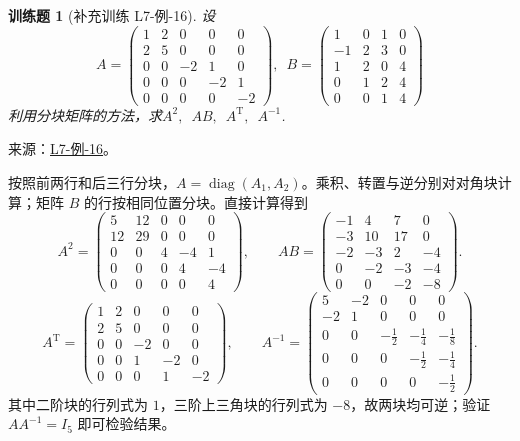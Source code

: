\documentclass[UTF8,12pt,a4paper,fontset=fandol]{ctexart}
\newtheorem{exercise}{训练题}[section]
\begin{document}
\begin{exercise}[补充训练 L7-例-16]\label{prob:L7-例-16}
设\[A=\begin{pmatrix}
            1 & 2 & 0  & 0  & 0  \\
            2 & 5 & 0  & 0  & 0  \\
            0 & 0 & -2 & 1  & 0  \\
            0 & 0 & 0  & -2 & 1  \\
            0 & 0 & 0  & 0  & -2
        \end{pmatrix},\enspace B=\begin{pmatrix}
            1  & 0 & 1 & 0 \\
            -1 & 2 & 3 & 0 \\
            1  & 2 & 0 & 4 \\
            0  & 1 & 2 & 4 \\
            0  & 0 & 1 & 4
        \end{pmatrix}\]
    利用分块矩阵的方法，求$A^2,\enspace AB,\enspace A^\mathrm{T},\enspace A^{-1}$.
\end{exercise}
\noindent 来源：\href{https://github.com/yhwu-is/Linear-Algebra-Left-Undone/blob/new/%E8%AE%B2%E4%B9%89/%E4%B8%93%E9%A2%98/7%20%E7%BA%BF%E6%80%A7%E6%98%A0%E5%B0%84%E7%9F%A9%E9%98%B5%E8%A1%A8%E7%A4%BA%E4%B8%8E%E7%9F%A9%E9%98%B5%E8%BF%90%E7%AE%97%E5%9F%BA%E7%A1%80.tex}{L7-例-16}。
\begin{solve}
按照前两行和后三行分块，$A=\operatorname{diag}(A_1,A_2)$。乘积、转置与逆分别对对角块计算；矩阵 $B$ 的行按相同位置分块。直接计算得到
\[A^2=\begin{pmatrix}5&12&0&0&0\\12&29&0&0&0\\0&0&4&-4&1\\0&0&0&4&-4\\0&0&0&0&4\end{pmatrix},\qquad AB=\begin{pmatrix}-1&4&7&0\\-3&10&17&0\\-2&-3&2&-4\\0&-2&-3&-4\\0&0&-2&-8\end{pmatrix}.\]
\[A^{\mathrm T}=\begin{pmatrix}1&2&0&0&0\\2&5&0&0&0\\0&0&-2&0&0\\0&0&1&-2&0\\0&0&0&1&-2\end{pmatrix},\qquad A^{-1}=\begin{pmatrix}5&-2&0&0&0\\-2&1&0&0&0\\0&0&-\frac{1}{2}&-\frac{1}{4}&-\frac{1}{8}\\0&0&0&-\frac{1}{2}&-\frac{1}{4}\\0&0&0&0&-\frac{1}{2}\end{pmatrix}.\]
其中二阶块的行列式为 $1$，三阶上三角块的行列式为 $-8$，故两块均可逆；验证 $AA^{-1}=I_5$ 即可检验结果。
\end{solve}
\end{document}
